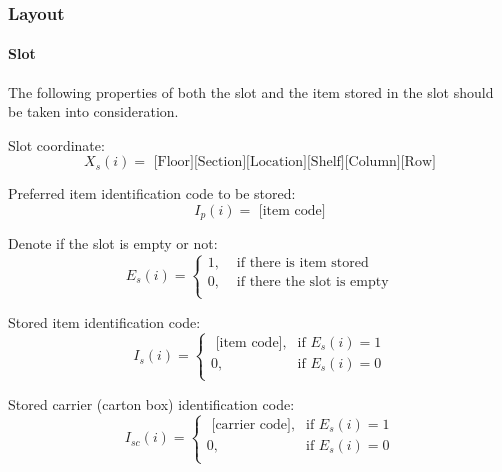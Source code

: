 \subsubsection{Layout}

\paragraph{Slot}\mbox{}

The following properties of both the slot and the item stored in the slot should be taken into consideration.

    Slot coordinate:
    \begin{equation}\label{eq:slot coordinate}
        X_s(i) = \text{ [Floor][Section][Location][Shelf][Column][Row]}
    \end{equation}

    Preferred item identification code to be stored:
    \begin{equation}\label{eq:pref IC}
        I_p(i) = \text{ [item code]}
    \end{equation}

    Denote if the slot is empty or not: 
    \begin{equation}\label{eq:empty}
        E_s(i) =  
        \begin{cases}
            1, & \text{ if there is item stored} \\
            0, & \text{ if there the slot is empty} \\
        \end{cases}
    \end{equation}
    
    Stored item identification code: 
    \begin{equation}\label{eq:stored item IC}
        I_s(i) =  
        \begin{cases}
            \text{ [item code]}, & \text{if  } E_s(i) = 1 \\
            0, & \text{if  } E_s(i) = 0 \\
        \end{cases}
    \end{equation}
        
    Stored carrier (carton box) identification code: 
    \begin{equation}\label{eq:storedcarrierIC}
        I_{sc}(i) =  
        \begin{cases}
            \text{ [carrier code]}, & \text{if  } E_s(i) = 1 \\
            0, & \text{if  } E_s(i) = 0 \\
        \end{cases}
    \end{equation}
    
